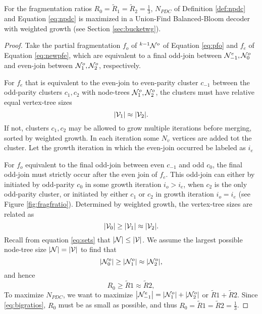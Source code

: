 \begin{theorem}\label{the:fragratio}
  For the fragmentation ratios $R_0 = \tilde{R}_1 = \tilde{R}_2 = \frac{1}{3}$, $N_{PDC}$ of Definition \ref{def:npdc} and Equation \eqref{eq:npdc} is maximized in a Union-Find Balanced-Bloom decoder with weighted growth (see Section \ref{sec:bucketwg}). 
\end{theorem}
\begin{proof}
  Take the partial fragmentation $f_o$ of ${}^{k-1}\mathcal{N}^o$ of Equation \eqref{eq:pfo} and $f_e$ of Equation \eqref{eq:newpfe}, which are equivalent to a final odd-join between $\mathcal{N}^e_{-1}, \mathcal{N}^o_0$ and even-join between $\mathcal{N}^o_1, \mathcal{N}^o_2$, respectively. 
  
  For $f_e$ that is equivalent to the even-join to even-parity cluster $c_{-1}$ between the odd-parity clusters $c_1, c_2$ with node-trees $\mathcal{N}^o_1, \mathcal{N}^o_2$, the clusters must have relative equal vertex-tree sizes 
  \begin{equation*}
    \abs{\mathcal{V}_1} \approx \abs{\mathcal{V}_2}.
  \end{equation*}
  If not, clusters $c_1, c_2$ may be allowed to grow multiple iterations before merging, sorted by weighted growth. In each iteration some $N_v$ vertices are added tot the cluster. Let the growth iteration in which the even-join occurred be labeled as $i_e$
  
  For $f_o$ equivalent to the final odd-join between even $c_{-1}$ and odd $c_0$, the final odd-join must strictly occur after the even join of $f_e$. This odd-join can either by initiated by odd-parity $c_0$ in some growth iteration $i_o > i_e$, when $c_2$ is the only odd-parity cluster, or initiated by either $c_1$ or $c_2$ in growth iteration $i_o = i_e$ (see Figure \ref{fig:fragfratio}). Determined by weighted growth, the vertex-tree sizes are related as
  \begin{equation*}
    \abs{\mathcal{V}_0} \geq \abs{\mathcal{V}_1} \approx \abs{\mathcal{V}_2}.
  \end{equation*}
  Recall from equation \eqref{eq:sets} that $|\mathcal{N}| \leq |\mathcal{V}|$. We assume the largest possible node-tree size $|\mathcal{N}| = |\mathcal{V}|$ to find that 
  \begin{equation*}
    \abs{\mathcal{N}^o_0} \geq \abs{\mathcal{N}^o_1} \approx \abs{\mathcal{N}^o_2},
  \end{equation*}
  and hence
  \begin{equation*}
    R_0 \geq \tilde{R}1 \approx \tilde{R}2,
  \end{equation*}
  To maximize $N_{PDC}$, we want to maximize $\abs{\mathcal{N}^e_{-1}} = \abs{\mathcal{N}^o_1} + \abs{\mathcal{N}^o_2}$ or $\tilde{R}1 + \tilde{R}2$. Since \eqref{eq:bigratios}, $R_0$ must be as small as possible, and thus $R_0 = \tilde{R}1 = \tilde{R}2 = \frac{1}{3}$. 
\end{proof}

